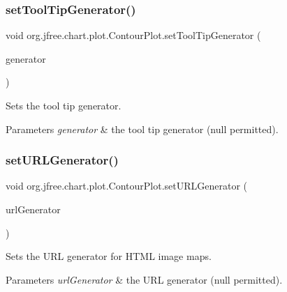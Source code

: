 \subsubsection{\texorpdfstring{set\+Tool\+Tip\+Generator()}{setToolTipGenerator()}}
{\footnotesize\ttfamily void org.\+jfree.\+chart.\+plot.\+Contour\+Plot.\+set\+Tool\+Tip\+Generator (\begin{DoxyParamCaption}\item[{\mbox{\hyperlink{interfaceorg_1_1jfree_1_1chart_1_1labels_1_1_contour_tool_tip_generator}{Contour\+Tool\+Tip\+Generator}}}]{generator }\end{DoxyParamCaption})}

Sets the tool tip generator.


\begin{DoxyParams}{Parameters}
{\em generator} & the tool tip generator (null permitted). \\
\hline
\end{DoxyParams}
\mbox{\label{classorg_1_1jfree_1_1chart_1_1plot_1_1_contour_plot_af5675f151722ed575d30cb4ececb85a0}} 
\subsubsection{\texorpdfstring{set\+U\+R\+L\+Generator()}{setURLGenerator()}}
{\footnotesize\ttfamily void org.\+jfree.\+chart.\+plot.\+Contour\+Plot.\+set\+U\+R\+L\+Generator (\begin{DoxyParamCaption}\item[{\mbox{\hyperlink{interfaceorg_1_1jfree_1_1chart_1_1urls_1_1_x_y_u_r_l_generator}{X\+Y\+U\+R\+L\+Generator}}}]{url\+Generator }\end{DoxyParamCaption})}

Sets the U\+RL generator for H\+T\+ML image maps.


\begin{DoxyParams}{Parameters}
{\em url\+Generator} & the U\+RL generator (null permitted). \\
\hline
\end{DoxyParams}
\mbox{\label{classorg_1_1jfree_1_1chart_1_1plot_1_1_contour_plot_aff13263089fd27354654832a635c99ee}} 
